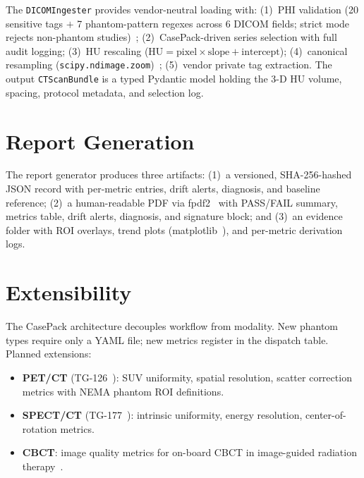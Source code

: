 \documentclass[11pt]{article}
\begin{document}
The \texttt{DICOMIngester} provides vendor-neutral loading with:
(1)~PHI validation (20 sensitive tags $+$ 7 phantom-pattern regexes
across 6 DICOM fields; strict mode rejects non-phantom
studies)~\cite{pydicom};
(2)~CasePack-driven series selection with full audit logging;
(3)~HU rescaling ($\text{HU} = \text{pixel} \times \text{slope} +
\text{intercept}$);
(4)~canonical resampling (\texttt{scipy.ndimage.zoom})~\cite{scipy};
(5)~vendor private tag extraction.
The output \texttt{CTScanBundle} is a typed Pydantic model holding
the 3-D HU volume, spacing, protocol metadata, and selection log.


\section{Report Generation}
\label{sec:reports}

The report generator produces three artifacts:
(1)~a versioned, SHA-256-hashed JSON record with per-metric
entries, drift alerts, diagnosis, and baseline reference;
(2)~a human-readable PDF via fpdf2~\cite{fpdf2} with PASS/FAIL
summary, metrics table, drift alerts, diagnosis, and signature
block; and
(3)~an evidence folder with ROI overlays, trend plots
(matplotlib~\cite{matplotlib}), and per-metric derivation logs.


\section{Extensibility}
\label{sec:extensibility}

The CasePack architecture decouples workflow from modality.
New phantom types require only a YAML file; new metrics register in
the dispatch table.
Planned extensions:

\begin{itemize}
  \item \textbf{PET/CT} (TG-126~\cite{aapm_tg126}): SUV uniformity,
    spatial resolution, scatter correction metrics with NEMA phantom
    ROI definitions.
  \item \textbf{SPECT/CT} (TG-177~\cite{aapm_tg177}): intrinsic
    uniformity, energy resolution, center-of-rotation metrics.
  \item \textbf{CBCT}: image quality metrics for on-board CBCT in
    image-guided radiation therapy~\cite{bissonnette2008cbct}.
\end{itemize}
\end{document}
